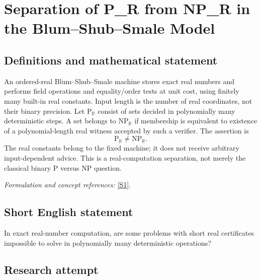 \documentclass[11pt,a4paper]{article}
\newcommand{\R}{\mathbb{R}}
\newcommand{\sref}[2]{\hyperlink{source:#1:#2}{[S#2]}}
\newif\ifshowcatalogue
\newcommand{\cataloguescope}[1]{\ifshowcatalogue
 \paragraph{Exact scope in the supplied catalogue.}
 \begin{quote}\small #1\end{quote}\fi}
\numberwithin{equation}{section}
\begin{document}
\setcounter{section}{0}
\clearpage
\section*{\texorpdfstring{Separation of P\_R from NP\_R in the Blum–Shub–Smale Model}{Separation of P\_R from NP\_R in the Blum–Shub–Smale Model}}\label{statement}
\subsection{Definitions and mathematical statement}
An ordered-real Blum--Shub--Smale machine stores exact real numbers and performs field operations and equality/order tests at unit cost, using finitely many built-in real constants. Input length is the number of real coordinates, not their binary precision. Let $\mathrm P_{\R}$ consist of sets decided in polynomially many deterministic steps. A set belongs to $\mathrm{NP}_{\R}$ if membership is equivalent to existence of a polynomial-length real witness accepted by such a verifier. The assertion is
\[
 \mathrm P_{\R}\ne\mathrm{NP}_{\R}.
\]
The real constants belong to the fixed machine; it does not receive arbitrary input-dependent advice. This is a real-computation separation, not merely the classical binary $\mathrm P$ versus $\mathrm{NP}$ question.
\par\smallskip\textit{Formulation and concept references:} \sref{statement}{1}.
\cataloguescope{In the standard ordered-real Blum–Shub–Smale model, machines use finitely many built-in real constants, real-valued registers, exact field operations (+,-,multiplication,division where defined) and order/equality tests at unit cost. Inputs are finite real vectors and size is vector length. Let P\_R be decision problems solved by deterministic machines in polynomially many steps, and NP\_R those with polynomial-length real witnesses verifiable in P\_R. The assertion is P\_R != NP\_R.}
\subsection{Short English statement}
In exact real-number computation, are some problems with short real certificates impossible to solve in polynomially many deterministic operations?
\subsection{Research attempt}
\end{document}
